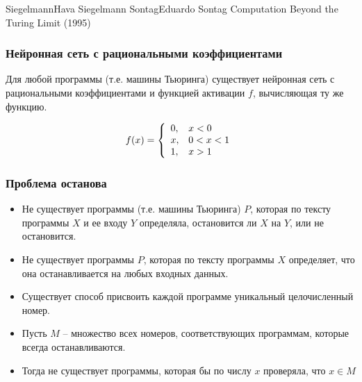 \documentclass[24pt,pdf,hyperref={unicode},aspectratio=169]{beamer}
\begin{document}
\begin{frame}
\doublebio
{Siegelmann}{Hava Siegelmann}
{Sontag}{Eduardo Sontag}
{
Computation Beyond the Turing Limit (1995)
}
\end{frame}

\begin{frame}\frametitle{Нейронная сеть с рациональными коэффициентами}

Для любой программы (т.е. машины Тьюринга) существует нейронная сеть с рациональными коэффициентами и функцией активации $f$, вычисляющая ту же функцию.

$$
f(x)=\left\{\begin{array}{l l}
0, & x<0 \\
x, & 0<x<1 \\
1, & x>1
\end{array}
\right.
$$

\end{frame}

\begin{frame}\frametitle{Проблема останова}
\begin{itemize}
\item Не существует программы (т.е. машины Тьюринга) $P$, которая по тексту программы $X$ и ее входу $Y$ определяла, остановится ли $X$ на $Y$, или не остановится.
\item Не существует программы $P$, которая по тексту программы $X$ определяет, что она останавливается на любых входных данных.
\item Существует способ присвоить каждой программе уникальный целочисленный номер.
\item Пусть $M$ -- множество всех номеров, соответствующих программам, которые всегда останавливаются.
\item Тогда не существует программы, которая бы по числу $x$ проверяла, что $x\in M$
\end{itemize}
\end{frame}
\end{document}
